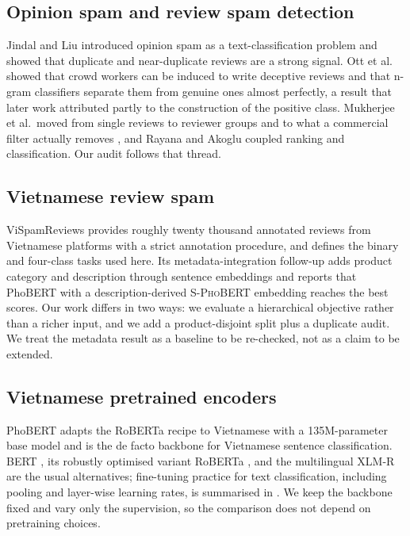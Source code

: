 \documentclass[12pt,a4paper]{article}
\newcommand{\phobert}{PhoBERT}
\newcommand{\vispam}{ViSpamReviews}
\begin{document}
\subsection{Opinion spam and review spam detection}
Jindal and Liu \cite{jindal2008} introduced opinion spam as a text-classification problem and showed that duplicate and near-duplicate reviews are a strong signal. Ott et al.\ \cite{ott2011} showed that crowd workers can be induced to write deceptive reviews and that n-gram classifiers separate them from genuine ones almost perfectly, a result that later work attributed partly to the construction of the positive class. Mukherjee et al.\ moved from single reviews to reviewer groups and to what a commercial filter actually removes \cite{mukherjee2012,mukherjee2013}, and Rayana and Akoglu \cite{rayana2015} coupled ranking and classification. Our audit follows that thread.

\subsection{Vietnamese review spam}
\vispam{} \cite{vispam2022} provides roughly twenty thousand annotated reviews from Vietnamese platforms with a strict annotation procedure, and defines the binary and four-class tasks used here. Its metadata-integration follow-up \cite{vispam2024} adds product category and description through sentence embeddings and reports that \phobert{} with a description-derived \textsc{S-PhoBERT} embedding reaches the best scores. Our work differs in two ways: we evaluate a hierarchical objective rather than a richer input, and we add a product-disjoint split plus a duplicate audit. We treat the metadata result as a baseline to be re-checked, not as a claim to be extended.

\subsection{Vietnamese pretrained encoders}
\phobert{} \cite{phobert} adapts the RoBERTa recipe \cite{roberta} to Vietnamese with a 135M-parameter base model and is the de facto backbone for Vietnamese sentence classification. BERT \cite{bert}, its robustly optimised variant RoBERTa \cite{roberta}, and the multilingual XLM-R \cite{xlmr} are the usual alternatives; fine-tuning practice for text classification, including pooling and layer-wise learning rates, is summarised in \cite{sun2019}. We keep the backbone fixed and vary only the supervision, so the comparison does not depend on pretraining choices.
\end{document}
